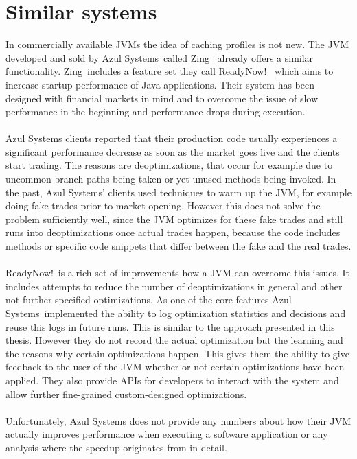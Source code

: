 \section{Similar systems}
\label{s:similarsystems}
In commercially available JVMs the idea of caching profiles is not new.
The JVM developed and sold by Azul Systems\textregistered\ called Zing\textregistered\ \cite{zing} already offers a similar functionality.
Zing\textregistered\ includes a feature set they call ReadyNow!\texttrademark\ \cite{readynow} which aims to increase startup performance of Java applications.
Their system has been designed with financial markets in mind and to overcome the issue of slow performance in the beginning and performance drops during execution.
\\\\
Azul Systems clients reported that their production code usually experiences a significant performance decrease as soon as the market goes live and the clients start trading.
The reasons are deoptimizations, that occur for example due to uncommon branch paths being taken or yet unused methods being invoked.
In the past, Azul Systems' clients used techniques to warm up the JVM, for example doing fake trades prior to market opening. However this does not solve the problem sufficiently well, since the JVM optimizes for these fake trades and still runs into deoptimizations once actual trades happen, because the code includes methods or specific code snippets that differ between the fake and the real trades.
\\\\
ReadyNow!\texttrademark\ is a rich set of improvements how a JVM can overcome this issues. It includes attempts to reduce the number of deoptimizations in general and other not further specified optimizations.
As one of the core features Azul Systems\textregistered\ implemented the ability to log optimization statistics and decisions and reuse this logs in future runs. This is similar to the approach presented in this thesis. However they do not record the actual optimization but the learning and the reasons why certain optimizations happen. This gives them the ability to give feedback to the user of the JVM whether or not certain optimizations have been applied. They also provide APIs for developers to interact with the system and allow further fine-grained custom-designed optimizations.
\\\\
Unfortunately, Azul Systems does not provide any numbers about how their JVM actually improves performance when executing a software application or any analysis where the speedup originates from in detail.
